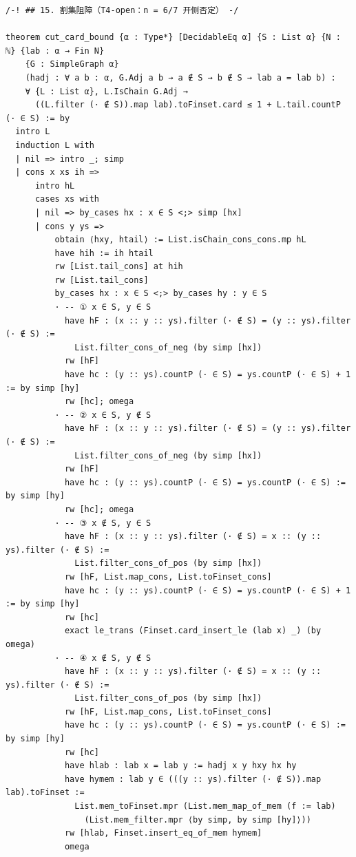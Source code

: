 \documentclass[11pt]{article}
\begin{document}
\begin{lstlisting}[caption={Verbatim lines 2447--2575: the cut barrier. The
generic lemmas \texttt{cut\_card\_bound} (label count along a chain),
\texttt{cut\_bound} and \texttt{no\_hamiltonian\_of\_cut}, then the explicit
$n=6$ certificate (6 middle-column vertices, 8 blocks) and $n=7$ certificate
(5 vertices, 7 blocks). The two \texttt{set\_option} resource-relaxation
lines preceding this section are omitted from the excerpt; the full file
carries them.},label={lst:proof-cut}]
/-! ## 15. 割集阻障（T4-open：n = 6/7 开侧否定） -/

theorem cut_card_bound {α : Type*} [DecidableEq α] {S : List α} {N : ℕ} {lab : α → Fin N}
    {G : SimpleGraph α}
    (hadj : ∀ a b : α, G.Adj a b → a ∉ S → b ∉ S → lab a = lab b) :
    ∀ {L : List α}, L.IsChain G.Adj →
      ((L.filter (· ∉ S)).map lab).toFinset.card ≤ 1 + L.tail.countP (· ∈ S) := by
  intro L
  induction L with
  | nil => intro _; simp
  | cons x xs ih =>
      intro hL
      cases xs with
      | nil => by_cases hx : x ∈ S <;> simp [hx]
      | cons y ys =>
          obtain ⟨hxy, htail⟩ := List.isChain_cons_cons.mp hL
          have hih := ih htail
          rw [List.tail_cons] at hih
          rw [List.tail_cons]
          by_cases hx : x ∈ S <;> by_cases hy : y ∈ S
          · -- ① x ∈ S, y ∈ S
            have hF : (x :: y :: ys).filter (· ∉ S) = (y :: ys).filter (· ∉ S) :=
              List.filter_cons_of_neg (by simp [hx])
            rw [hF]
            have hc : (y :: ys).countP (· ∈ S) = ys.countP (· ∈ S) + 1 := by simp [hy]
            rw [hc]; omega
          · -- ② x ∈ S, y ∉ S
            have hF : (x :: y :: ys).filter (· ∉ S) = (y :: ys).filter (· ∉ S) :=
              List.filter_cons_of_neg (by simp [hx])
            rw [hF]
            have hc : (y :: ys).countP (· ∈ S) = ys.countP (· ∈ S) := by simp [hy]
            rw [hc]; omega
          · -- ③ x ∉ S, y ∈ S
            have hF : (x :: y :: ys).filter (· ∉ S) = x :: (y :: ys).filter (· ∉ S) :=
              List.filter_cons_of_pos (by simp [hx])
            rw [hF, List.map_cons, List.toFinset_cons]
            have hc : (y :: ys).countP (· ∈ S) = ys.countP (· ∈ S) + 1 := by simp [hy]
            rw [hc]
            exact le_trans (Finset.card_insert_le (lab x) _) (by omega)
          · -- ④ x ∉ S, y ∉ S
            have hF : (x :: y :: ys).filter (· ∉ S) = x :: (y :: ys).filter (· ∉ S) :=
              List.filter_cons_of_pos (by simp [hx])
            rw [hF, List.map_cons, List.toFinset_cons]
            have hc : (y :: ys).countP (· ∈ S) = ys.countP (· ∈ S) := by simp [hy]
            rw [hc]
            have hlab : lab x = lab y := hadj x y hxy hx hy
            have hymem : lab y ∈ (((y :: ys).filter (· ∉ S)).map lab).toFinset :=
              List.mem_toFinset.mpr (List.mem_map_of_mem (f := lab)
                (List.mem_filter.mpr ⟨by simp, by simp [hy]⟩))
            rw [hlab, Finset.insert_eq_of_mem hymem]
            omega


\end{lstlisting}
\end{document}
